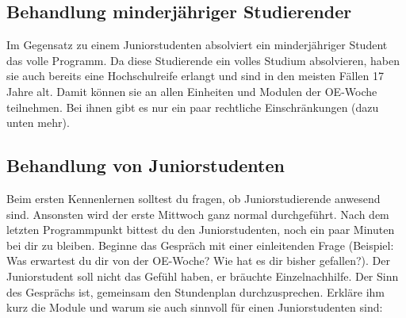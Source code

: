 \documentclass[a4paper,11pt]{scrartcl} %
\begin{document}
	\subsection{Behandlung minderjähriger Studierender}

Im Gegensatz zu einem Juniorstudenten absolviert ein minderjähriger Student das volle Programm. Da diese Studierende ein volles Studium absolvieren, haben sie auch bereits eine Hochschulreife erlangt und sind in den meisten Fällen 17 Jahre alt. Damit können sie an allen Einheiten und Modulen der OE-Woche teilnehmen. Bei ihnen gibt es nur ein paar rechtliche Einschränkungen (dazu unten mehr).

	\subsection{Behandlung von Juniorstudenten}

Beim ersten Kennenlernen solltest du fragen, ob Juniorstudierende anwesend sind. Ansonsten wird der erste Mittwoch ganz normal durchgeführt. Nach dem letzten Programmpunkt bittest du den Juniorstudenten, noch ein paar Minuten bei dir zu bleiben. Beginne das Gespräch mit einer einleitenden Frage (Beispiel: Was erwartest du dir von der OE-Woche? Wie hat es dir bisher gefallen?). Der Juniorstudent soll nicht das Gefühl haben, er bräuchte Einzelnachhilfe. Der Sinn des Gesprächs ist, gemeinsam den Stundenplan durchzusprechen. Erkläre ihm kurz die Module und warum sie auch sinnvoll für einen Juniorstudenten sind:

\newpage
\end{document}
